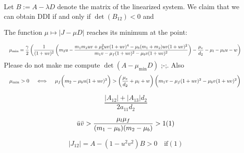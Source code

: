 \begin{lemma} Let $B := A - \lambda D$ denote the matrix of the linearized system. We claim that we can obtain DDI if and only if $\det(B_{12}) < 0$ and 
	
\end{lemma}


\begin{remark}[Minimum] The function $\mu \longmapsto |J - \mu D|$ reaches its minimum at the point:
	
\begin{equation}
	\resizebox{\hsize}{!}{%
		$\mu_{\mathbf{\mathrm{min}}} = \dfrac{\gamma}{2}\left( \dfrac{1}{(1+uv)^2}\left( m_2 u -  \dfrac{m_1m_2uv + \mu_b^2 uv(1+uv)^4 - \mu_b(m_1 + m_2) uv(1+uv)^2}{m_1 v - \mu_f (1 + uv)^2 - \mu_b v(1+uv)^2} \right)-\dfrac{\mu_e}{d_2} - \mu_l - \mu_b u - w\right) \notag$  
	}
\end{equation}
Please do not make me compute $\det(A - \mu_{\textrm{min}} D)$ ;-;. Also
\begin{equation}
	\resizebox{\hsize}{!}{%
		$\mu_{\mathbf{\mathrm{min}}} > 0 \quad \iff\quad \mu_f \biggl(m_2 - \mu_b u (1 + uv)^2\biggr) > \left( \dfrac{\mu_e}{d_2} + \mu_l + w \right) \biggl( m_1 v - \mu_f(1+uv)^2 - \mu_b v (1 + uv)^2\biggr) \notag$  
	}
\end{equation}
\end{remark}



$$\frac{|A_{12}| + |A_{13}|d_2}{2a_{11} d_2}$$


$$\bar u \bar v > \frac{\mu_l\mu_f}{(m_1 -\mu_b)(m_2 - \mu_b)} > 1 (1)$$

$$|J_{12}| = A - (1 - u^2 v^2)B > 0 \quad \text{if} (1)$$

